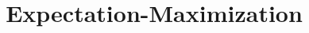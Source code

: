 \title{Expectation-Maximization}
\label{chp:expectation-maximization}
\author{}
\institute{}
\maketitle